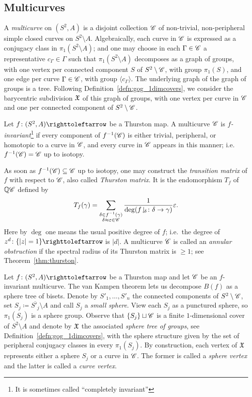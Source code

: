 \documentclass{amsart}
\begin{document}
\subsection{Multicurves}\label{ss:multicurves}
A \emph{multicurve} on $(S^2,A)$ is a disjoint collection ${\mathscr C}$ of
non-trivial, non-peripheral simple closed curves on $S^2\setminus A$.
Algebraically, each curve in ${\mathscr C}$ is expressed as a conjugacy class
in $\pi_1(S^2\setminus A)$; and one may choose in each $\Gamma\in{\mathscr C}$
a representative $c_\Gamma\in\Gamma$ such that $\pi_1(S^2\setminus A)$
decomposes as a graph of groups, with one vertex per connected
component $S$ of $S^2\setminus{\mathscr C}$, with group $\pi_1(S)$, and one
edge per curve $\Gamma\in{\mathscr C}$, with group $\langle c_\Gamma\rangle$.
The underlying graph of the graph of groups is a tree. Following
Definition~\ref{defn:gog_1dimcovers}, we consider the barycentric
subdivision ${\mathfrak X}$ of this graph of groups, with one vertex per curve
in ${\mathscr C}$ and one per connected component of $S^2\setminus{\mathscr C}$.

Let $f\colon(S^2,A)\selfmap$ be a Thurston map. A multicurve ${\mathscr C}$ is
\emph{$f$-invariant}\footnote{It is sometimes called ``completely
  invariant''} if every component of $f^{-1}({\mathscr C})$ is either trivial,
peripheral, or homotopic to a curve in ${\mathscr C}$, and every curve in ${\mathscr C}$
appears in this manner; i.e.\ $f^{-1}({\mathscr C})={\mathscr C}$ up to isotopy.

As soon as $f^{-1}({\mathscr C})\subseteq{\mathscr C}$ up to isotopy, one may construct
the \emph{transition matrix} of $f$ with respect to ${\mathscr C}$, also called
\emph{Thurston matrix}. It is the endomorphism $T_f$ of ${\mathbb Q}{\mathscr C}$
defined by
\begin{equation}\label{eq:thurston matrix}
  T_f(\gamma)=\sum_{\substack{\delta\in
      f^{-1}(\gamma)\\\delta\approx\varepsilon\in{\mathscr C}}}\frac1{\deg(f\!\downharpoonleft_{\!\delta}\colon\delta\to\gamma)}\varepsilon.
\end{equation}
Here by $\deg$ one means the usual positive degree of $f$; i.e.\ the
degree of $z^d\colon\{|z|=1\}\selfmap$ is $|d|$. A multicurve ${\mathscr C}$ is
called an \emph{annular obstruction} if the spectral radius of its
Thurston matrix is $\ge1$; see Theorem~\ref{thm:thurston}.

Let $f\colon (S^2,A)\selfmap$ be a Thurston map and let ${\mathscr C}$ be an
$f$-invariant multicurve. The van Kampen theorem lets us decompose
$B(f)$ as a sphere tree of bisets. Denote by $S'_1,\dots,S'_n$ the
connected components of $S^2\setminus{\mathscr C}$, set
$S_j\coloneqq \overline {S'_j}\setminus A$ and call $S_j$ a
\emph{small sphere}. View each $S_j$ as a punctured sphere, so
$\pi_1(S_j)$ is a sphere group. Observe that $\{S_j\}\sqcup {\mathscr C}$ is a
finite $1$-dimensional cover of $S^2\setminus A$ and denote by ${\mathfrak X}$
the associated \emph{sphere tree of groups}, see
Definition~\ref{defn:gog_1dimcovers}, with the sphere structure given
by the set of peripheral conjugacy classes in every $\pi_1(S_j)$. By
construction, each vertex of ${\mathfrak X}$ represents either a sphere $S_j$ or
a curve in ${\mathscr C}$. The former is called a \emph{sphere vertex} and the
latter is called a \emph{curve vertex}.
\end{document}
